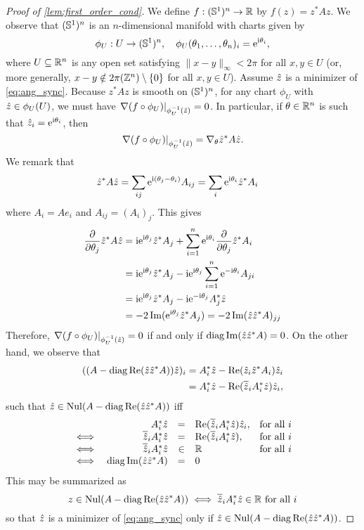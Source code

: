 \begin{proof}[Proof of \cref{lem:first_order_cond}]
  We define $f : (\mathbb{S}^1)^n \to \mathbb{R}$ by $f(z) = z^* A z$.  We observe that $(\mathbb{S}^1)^n$ is an $n$-dimensional manifold with charts given by \[\phi_U : U \to (\mathbb{S}^1)^n,\quad \phi_U(\theta_1, \ldots, \theta_n)_i = \mathrm{e}^{\mathrm{i} \theta_i},\] where $U \subseteq \mathbb{R}^n$ is any open set satisfying $\lVert x - y\rVert_\infty < 2 \pi$ for all $x, y \in U$ (or, more generally, $x - y \notin 2 \pi (\mathbb{Z}^n) \setminus \{0\}$ for all $x, y \in U$).  Assume $\hat{z}$ is a minimizer of \eqref{eq:ang_sync}.  Because $z^* A z$ is smooth on $(\mathbb{S}^1)^n$, for any chart $\phi_U$ with $\hat{z} \in \phi_U(U)$, we must have $\left.\nabla (f \circ \phi_U)\right|_{\phi_U^{-1}(\hat{z})} = 0$.  In particular, if $\theta \in \mathbb{R}^n$ is such that $\hat{z}_i = \mathrm{e}^{\mathrm{i} \theta_i}$, then \[\left.\nabla (f \circ \phi_U)\right|_{\phi_U^{-1}(\hat{z})} = \nabla_\theta \hat{z}^* A \hat{z}.\]  We remark that \begin{align*} \hat{z}^* A \hat{z} &= \sum_{ij} \mathrm{e}^{\mathrm{i} (\theta_j - \theta_i)} A_{ij} = \sum_i \mathrm{e}^{\mathrm{i} \theta_i} \hat{z}^* A_i \end{align*} where $A_i = A e_i$ and $A_{ij} = (A_i)_j$.  This gives \begin{align*} \frac{\partial}{\partial \theta_j} \hat{z}^* A \hat{z} &= \mathrm{i} \mathrm{e}^{\mathrm{i} \theta_j} \hat{z}^* A_j + \sum_{i = 1}^n \mathrm{e}^{\mathrm{i} \theta_i} \frac{\partial}{\partial \theta_j} \hat{z}^* A_i \\ &= \mathrm{i} \mathrm{e}^{\mathrm{i} \theta_j} \hat{z}^* A_j - \mathrm{i} \mathrm{e}^{\mathrm{i} \theta_j} \sum_{i = 1}^n \mathrm{e}^{-\mathrm{i} \theta_i} A_{ji} \\ &= \mathrm{i} \mathrm{e}^{\mathrm{i} \theta_j} \hat{z}^* A_j - \mathrm{i}\mathrm{e}^{-\mathrm{i} \theta_j} A_j^* \hat{z} \\ &= -2 \operatorname{Im}(\mathrm{e}^{\mathrm{i} \theta_j} \hat{z}^* A_j) = -2 \operatorname{Im} (\hat{z} \hat{z}^* A)_{jj}\end{align*}  Therefore, $\left.\nabla (f \circ \phi_U)\right|_{\phi_U^{-1}(\hat{z})} = 0$ if and only if $\operatorname{diag} \operatorname{Im}(\hat{z} \hat{z}^* A) = 0$.  On the other hand, we observe that \begin{align*} ((A - \operatorname{diag} \operatorname{Re}(\hat{z} \hat{z}^* A)) \hat{z})_i &= A_i^* \hat{z} - \operatorname{Re}(\hat{z}_i \hat{z}^* A_i) \hat{z}_i \\ &= A_i^* \hat{z} - \operatorname{Re}(\overline{\hat{z}}_i A_i^* \hat{z}) \hat{z}_i,\end{align*} such that $\hat{z} \in \operatorname{Nul}(A - \operatorname{diag} \operatorname{Re}(\hat{z} \hat{z}^* A))$ iff
  \[
  \begin{array}{crcll}
    & A_i^* \hat{z} & = & \operatorname{Re}(\overline{\hat{z}}_i A_i^* \hat{z}) \hat{z}_i, & \text{for all}\ i \\
    \iff & \overline{\hat{z}}_i A_i^* \hat{z} & = & \operatorname{Re}(\overline{\hat{z}}_i A_i^* \hat{z}), & \text{for all}\ i \\
    \iff & \overline{\hat{z}}_i A_i^* \hat{z} & \in & \mathbb{R} & \text{for all}\ i \\
    \iff & \operatorname{diag} \operatorname{Im}(\hat{z} \hat{z}^* A) & = & 0
  \end{array}
  \]
  This may be summarized as \begin{equation} z \in \operatorname{Nul}(A - \operatorname{diag} \operatorname{Re}(\hat{z} \hat{z}^* A)) \iff \overline{\hat{z}}_i A_i^* \hat{z} \in \mathbb{R} \ \text{for all}\ i \label{eq:null_iff_real} \end{equation} so that $\hat{z}$ is a minimizer of \eqref{eq:ang_sync} only if $\hat{z} \in \operatorname{Nul}(A - \operatorname{diag}\operatorname{Re}(\hat{z}\hat{z}^* A))$.
\end{proof}

